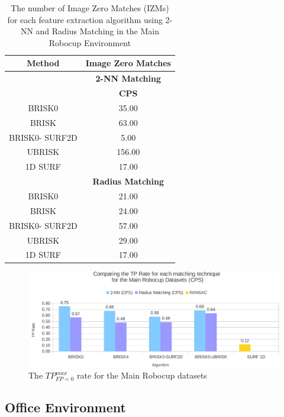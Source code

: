 \documentclass[11pt]{report}
\begin{document}
\begin{table}
\caption{The number of Image Zero Matches (IZMs) for each feature extraction
algorithm using 2-NN and Radius Matching in the Main Robocup Environment}
\begin{tabular}{|c|c|}
\hline 
\textbf{Method} & \multicolumn{1}{c|}{\textbf{Image Zero Matches}}\tabularnewline
\hline 
 & \multicolumn{1}{c|}{\textbf{2-NN Matching}}\tabularnewline
\hline 
 & \textbf{CPS}\tabularnewline
\hline 
\hline 
BRISK0 & 35.00\tabularnewline
\hline 
BRISK & 63.00\tabularnewline
\hline 
BRISK0- SURF2D & 5.00\tabularnewline
\hline 
UBRISK & 156.00\tabularnewline
\hline 
1D SURF & 17.00\tabularnewline
\hline 
 & \multicolumn{1}{c|}{\textbf{Radius Matching}}\tabularnewline
\hline 
BRISK0 & 21.00\tabularnewline
\hline 
BRISK & 24.00\tabularnewline
\hline 
BRISK0- SURF2D & 57.00\tabularnewline
\hline 
UBRISK & 29.00\tabularnewline
\hline 
1D SURF & 17.00\tabularnewline
\hline 
\end{tabular}
\label{app:mrd_izm}
\end{table}

\begin{figure}
  \centering
    \includegraphics[width=1.0\textwidth]{../Drawings/Graphs/tp_rate_mrb_cps.pdf}
    \caption{The $TP_{FP=0}^{max}$ rate for the Main Robocup datasets} 
    \label{app:tp_rate_mrd}
\end{figure}



\subsection{Office Environment}
\label{app:oe}
\end{document}
